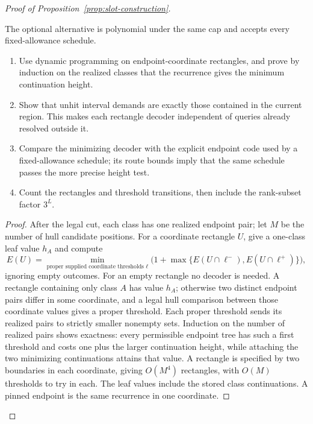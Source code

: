 \begin{proof}[Proof of Proposition~\ref{prop:slot-construction}]
\begin{claim}
The optional alternative is polynomial under the same cap and
accepts every fixed-allowance schedule.
\end{claim}
\begin{proofstrategy}
\begin{enumerate}
\item Use dynamic programming on endpoint-coordinate rectangles, and
      prove by induction on the realized classes that the recurrence
      gives the minimum continuation height.
\item Show that unhit interval demands are exactly those contained in
      the current region. This makes each rectangle decoder independent
      of queries already resolved outside it.
\item Compare the minimizing decoder with the explicit endpoint code
      used by a fixed-allowance schedule; its route bounds imply that the
      same schedule passes the more precise height test.
\item Count the rectangles and threshold transitions, then include the
      rank-subset factor $3^L$.
\end{enumerate}
\end{proofstrategy}
\begin{proof}
After the legal cut, each class has one realized endpoint pair; let
$M$ be the number of hull candidate positions.
For a coordinate rectangle $U$, give a one-class leaf value $h_A$
and compute
\[
 E(U)=\min_{\text{proper supplied coordinate thresholds }\ell}
 \bigl(1+\max\{E(U\cap\ell^-),E(U\cap\ell^+)\}\bigr),
\]
ignoring empty outcomes. For an empty rectangle no decoder is
needed. A rectangle containing only class $A$ has value $h_A$;
otherwise two distinct endpoint pairs differ in some coordinate,
and a legal hull comparison between those coordinate values gives
a proper threshold. Each proper threshold sends its realized pairs
to strictly smaller nonempty sets. Induction on the number of realized pairs
shows exactness: every permissible endpoint tree has such a first
threshold and costs one plus the larger continuation height, while
attaching the two minimizing continuations attains that value.
A rectangle is specified by two boundaries in each coordinate,
giving $O(M^4)$ rectangles, with $O(M)$ thresholds to try in each.
The leaf values include the stored class continuations. A pinned
endpoint is the same recurrence in one coordinate.


\end{proof}
\end{proof}
